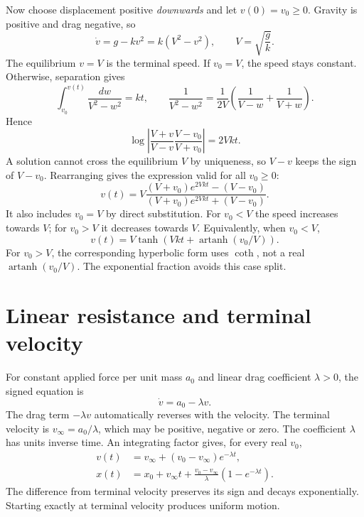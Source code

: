 \begin{example}
Now choose displacement positive \emph{downwards} and let $v(0)=v_0\geq0$.
Gravity is positive and drag negative, so
\[
\dot v=g-kv^2=k(V^2-v^2),\qquad V=\sqrt{\frac gk}.
\]
The equilibrium $v=V$ is the terminal speed. If $v_0=V$, the speed stays
constant. Otherwise, separation gives
\[
\int_{v_0}^{v(t)}\frac{dw}{V^2-w^2}=kt,
\qquad
\frac1{V^2-w^2}=\frac1{2V}\left(\frac1{V-w}+\frac1{V+w}\right).
\]
Hence
\[
\log\left|\frac{V+v}{V-v}\frac{V-v_0}{V+v_0}\right|=2Vkt.
\]
A solution cannot cross the equilibrium $V$ by uniqueness, so $V-v$ keeps
the sign of $V-v_0$. Rearranging gives the expression valid for all
$v_0\geq0$:
\begin{equation}\label{eq:applied-quadratic-drag}
v(t)=V\frac{(V+v_0)e^{2Vkt}-(V-v_0)}
              {(V+v_0)e^{2Vkt}+(V-v_0)}.
\end{equation}
It also includes $v_0=V$ by direct substitution. For $v_0<V$ the speed
increases towards $V$; for $v_0>V$ it decreases towards $V$.
Equivalently, when $v_0<V$,
\[
v(t)=V\tanh\left(Vkt+\operatorname{artanh}(v_0/V)\right).
\]
For $v_0>V$, the corresponding hyperbolic form uses $\coth$, not a real
$\operatorname{artanh}(v_0/V)$. The exponential fraction avoids this case split.
\end{example}

\section{Linear resistance and terminal velocity}
For constant applied force per unit mass $a_0$ and linear drag coefficient
$\lambda>0$, the signed equation is
\[
\dot v=a_0-\lambda v.
\]
The drag term $-\lambda v$ automatically reverses with the velocity.
The terminal velocity is $v_\infty=a_0/\lambda$, which may be positive,
negative or zero. The coefficient $\lambda$ has units inverse time.
An integrating factor gives, for every real $v_0$,
\begin{align*}
v(t)&=v_\infty+(v_0-v_\infty)e^{-\lambda t},\\
x(t)&=x_0+v_\infty t+
\frac{v_0-v_\infty}{\lambda}(1-e^{-\lambda t}).
\end{align*}
The difference from terminal velocity preserves its sign and decays
exponentially. Starting exactly at terminal velocity produces uniform motion.


